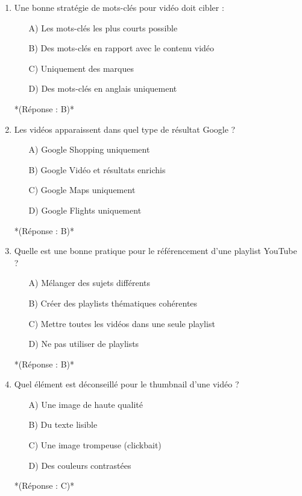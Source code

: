 \documentclass[12pt,a4paper,twoside]{report}
\begin{document}
\begin{enumerate}
    \item Une bonne stratégie de mots-clés pour vidéo doit cibler :
    \begin{itemize}
        \item[A)] Les mots-clés les plus courts possible
        \item[B)] Des mots-clés en rapport avec le contenu vidéo
        \item[C)] Uniquement des marques
        \item[D)] Des mots-clés en anglais uniquement
    \end{itemize}
    *(Réponse : B)*

    \item Les vidéos apparaissent dans quel type de résultat Google ?
    \begin{itemize}
        \item[A)] Google Shopping uniquement
        \item[B)] Google Vidéo et résultats enrichis
        \item[C)] Google Maps uniquement
        \item[D)] Google Flights uniquement
    \end{itemize}
    *(Réponse : B)*

    \item Quelle est une bonne pratique pour le référencement d'une playlist YouTube ?
    \begin{itemize}
        \item[A)] Mélanger des sujets différents
        \item[B)] Créer des playlists thématiques cohérentes
        \item[C)] Mettre toutes les vidéos dans une seule playlist
        \item[D)] Ne pas utiliser de playlists
    \end{itemize}
    *(Réponse : B)*

    \item Quel élément est déconseillé pour le thumbnail d'une vidéo ?
    \begin{itemize}
        \item[A)] Une image de haute qualité
        \item[B)] Du texte lisible
        \item[C)] Une image trompeuse (clickbait)
        \item[D)] Des couleurs contrastées
    \end{itemize}
    *(Réponse : C)*


\end{enumerate}
\end{document}
